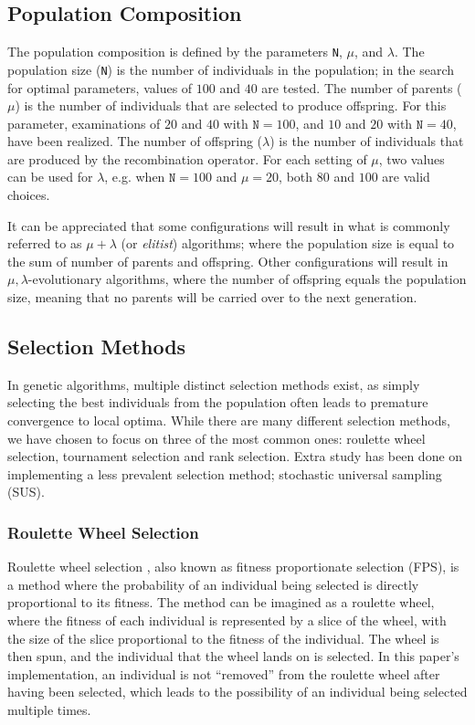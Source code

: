 \documentclass{article}
\begin{document}
\subsection{Population Composition}
\label{subsec:ga_pop}

The population composition is defined by the parameters \texttt{N}, $\mu$, and $\lambda$.
The population size (\texttt{N}) is the number of individuals in the population; in the search for optimal parameters, values of $100$ and $40$ are tested.
The number of parents ($\mu$) is the number of individuals that are selected to produce offspring.
For this parameter, examinations of $20$ and $40$ with $\texttt{N}=100$, and $10$ and $20$ with $\texttt{N}=40$, have been realized.
The number of offspring ($\lambda$) is the number of individuals that are produced by the recombination operator.
For each setting of $\mu$, two values can be used for $\lambda$, e.g. when $\texttt{N}=100$ and $\mu=20$, both $80$ and $100$ are valid choices.

It can be appreciated that some configurations will result in what is commonly referred to as $\mu + \lambda$ (or \textit{elitist}) algorithms; where the population size is equal to the sum of number of parents and offspring.
Other configurations will result in $\mu, \lambda$-evolutionary algorithms, where the number of offspring equals the population size, meaning that no parents will be carried over to the next generation.


\subsection{Selection Methods}
\label{subsec:ga_sel}

In genetic algorithms, multiple distinct selection methods exist, as simply selecting the best individuals from the population often leads to premature convergence to local optima.
While there are many different selection methods, we have chosen to focus on three of the most common ones: roulette wheel selection, tournament selection and rank selection.
Extra study has been done on implementing a less prevalent selection method; stochastic universal sampling (SUS).

\subsubsection*{Roulette Wheel Selection}
\label{subsubsec:ga_sel_rws}
Roulette wheel selection \cite{roulettewheel}, also known as fitness proportionate selection (FPS), is a method where the probability of an individual being selected is directly proportional to its fitness.
The method can be imagined as a roulette wheel, where the fitness of each individual is represented by a slice of the wheel, with the size of the slice proportional to the fitness of the individual.
The wheel is then spun, and the individual that the wheel lands on is selected.
In this paper's implementation, an individual is not ``removed'' from the roulette wheel after having been selected, which leads to the possibility of an individual being selected multiple times.
\end{document}
